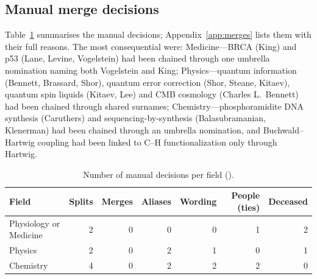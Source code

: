 \documentclass[11pt]{article}
\newcommand{\code}[1]{\texttt{\detokenize{#1}}}
\begin{document}
\begin{table}[ht]\centering\small
\caption{Committee diagnostics per field (A = Anthropic, O = OpenAI, G = Gemini).}\label{tab:diag}
\end{table}
\subsection{Manual merge decisions}

Table~\ref{tab:manual} summarises the manual decisions; Appendix~\ref{app:merges} lists them with their full reasons.
The most consequential were: Medicine---BRCA (King) and p53 (Lane, Levine, Vogelstein) had been chained through one
umbrella nomination naming both Vogelstein and King; Physics---quantum information (Bennett, Brassard, Shor), quantum
error correction (Shor, Steane, Kitaev), quantum spin liquids (Kitaev, Lee) and CMB cosmology (Charles L.\ Bennett) had
been chained through shared surnames; Chemistry---phosphoramidite DNA synthesis (Caruthers) and sequencing-by-synthesis
(Balasubramanian, Klenerman) had been chained through an umbrella nomination, and Buchwald--Hartwig coupling had been
linked to C--H functionalization only through Hartwig.

\begin{table}[ht]\centering\small
\caption{Number of manual decisions per field (\code{merges.yaml}).}\label{tab:manual}
\begin{tabular}{lrrrrrr}\toprule
Field & Splits & Merges & Aliases & Wording & People (ties) & Deceased\\\midrule
Physiology or Medicine & 2 & 0 & 0 & 0 & 1 & 2\\
Physics & 2 & 0 & 2 & 1 & 0 & 1\\
Chemistry & 4 & 0 & 2 & 2 & 2 & 0\\
\bottomrule\end{tabular}\end{table}
\end{document}
